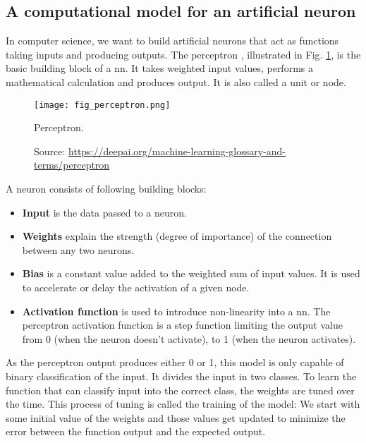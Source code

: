 \subsection{A computational model for an artificial neuron}
In computer science, we want to build artificial neurons that act as functions taking inputs and producing outputs. The perceptron \cite{rosenblatt1958perceptron, minsky2017perceptrons}, illustrated in Fig. \ref{fig:perceptron}, is the basic building block of a \acrfull{nn}. It takes weighted input values, performs a mathematical calculation and produces output. It is also called a unit or node.
\begin{figure}[ht]
    \begin{center}
    \texttt{[image: fig\_perceptron.png]}
    \caption[Perceptron]{Perceptron.}
    \caption*{Source: \href{https://deepai.org/machine-learning-glossary-and-terms/perceptron}{https://deepai.org/machine-learning-glossary-and-terms/perceptron}}
    \label{fig:perceptron}
    \end{center}
\end{figure}
A neuron consists of following building blocks:
\begin{itemize}
    \item \textbf{Input} is the data passed to a neuron.
    \item \textbf{Weights} explain the strength (degree of importance) of the connection between any two neurons.
    \item \textbf{Bias} is a constant value added to the weighted sum of input values. It is used to accelerate or delay the activation of a given node.
    \item \textbf{Activation function} is used to introduce non-linearity into a \acrshort{nn}. The perceptron activation function is a step function limiting the output value from 0 (when the neuron doesn't activate), to 1 (when the neuron activates).
\end{itemize}
As the perceptron output produces either 0 or 1, this model is only capable of binary classification of the input. It divides the input in two classes. To learn the function that can classify input into the correct class, the weights are tuned over the time. This process of tuning is called the training of the model: We start with some initial value of the weights and those values get updated to minimize the error between the function output and the expected output.

